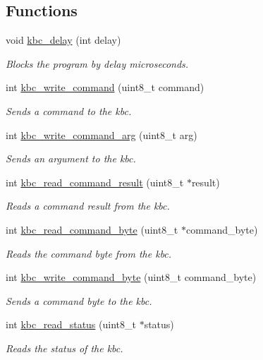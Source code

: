 \subsection*{Functions}
\begin{DoxyCompactItemize}
\item 
void \hyperlink{group__kbc_ga594c74b8ef8c0d8a660bcdb729b1f381}{kbc\+\_\+delay} (int delay)
\begin{DoxyCompactList}\small\item\em Blocks the program by delay microseconds. \end{DoxyCompactList}\item 
int \hyperlink{group__kbc_ga8c467e640bc33719fe3ed7bcb73f2121}{kbc\+\_\+write\+\_\+command} (uint8\+\_\+t command)
\begin{DoxyCompactList}\small\item\em Sends a command to the kbc. \end{DoxyCompactList}\item 
int \hyperlink{group__kbc_ga24f1a4d1bcb60a73ebd6cee462191a52}{kbc\+\_\+write\+\_\+command\+\_\+arg} (uint8\+\_\+t arg)
\begin{DoxyCompactList}\small\item\em Sends an argument to the kbc. \end{DoxyCompactList}\item 
int \hyperlink{group__kbc_ga65f11cca39a73154ab68dabac8b12683}{kbc\+\_\+read\+\_\+command\+\_\+result} (uint8\+\_\+t $\ast$result)
\begin{DoxyCompactList}\small\item\em Reads a command result from the kbc. \end{DoxyCompactList}\item 
int \hyperlink{group__kbc_gadc6d5fbf9c3a43d168962776591ac75b}{kbc\+\_\+read\+\_\+command\+\_\+byte} (uint8\+\_\+t $\ast$command\+\_\+byte)
\begin{DoxyCompactList}\small\item\em Reads the command byte from the kbc. \end{DoxyCompactList}\item 
int \hyperlink{group__kbc_ga5e840dccbbe5abccff8ca66f78c476c9}{kbc\+\_\+write\+\_\+command\+\_\+byte} (uint8\+\_\+t command\+\_\+byte)
\begin{DoxyCompactList}\small\item\em Sends a command byte to the kbc. \end{DoxyCompactList}\item 
int \hyperlink{group__kbc_gaa4c58a11cd49c54cc0eb02a79010a9cc}{kbc\+\_\+read\+\_\+status} (uint8\+\_\+t $\ast$status)
\begin{DoxyCompactList}\small\item\em Reads the status of the kbc. \end{DoxyCompactList}\end{DoxyCompactItemize}


